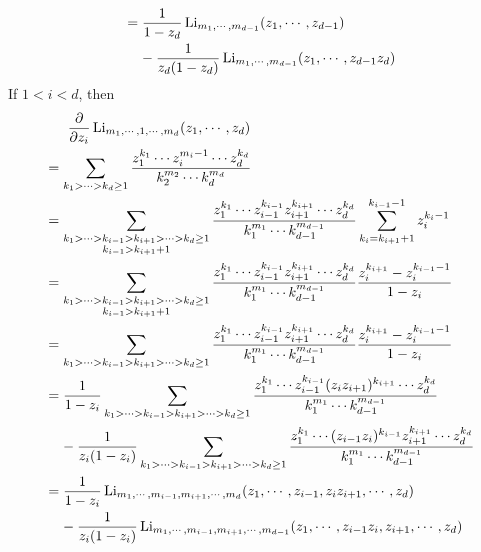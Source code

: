 \documentclass[main]{subfiles}
\begin{document}
\begin{exercise}
\begin{align*}
&=\frac{1}{1-z_d}\operatorname{Li}_{m_1,\cdots,m_{d-1}}(z_1,\cdots,z_{d-1}) \\
&\mkern20mu-\frac{1}{z_d(1-z_d)}\operatorname{Li}_{m_1,\cdots,m_{d-1}}(z_1,\cdots,z_{d-1}z_d)
\end{align*}
If $1<i<d$, then
\begin{align*}
&\mkern30mu\dfrac{\partial}{\partial z_i}\operatorname{Li}_{m_1,\cdots,1,\cdots,m_d}(z_1,\cdots,z_d) \\
&=\sum_{k_1>\cdots>k_d\geq1}\frac{z_1^{k_1}\cdots z_i^{m_i-1}\cdots z_d^{k_d}}{k_2^{m_2}\cdots k_d^{m_d}} \\
&=\sum_{\substack{k_1>\cdots>k_{i-1}>k_{i+1}>\cdots>k_d\geq1 \\ k_{i-1}>k_{i+1}+1}}\frac{z_1^{k_1}\cdots z_{i-1}^{k_{i-1}}z_{i+1}^{k_{i+1}}\cdots z_d^{k_d}}{k_1^{m_1}\cdots k_{d-1}^{m_{d-1}}}\sum_{k_i=k_{i+1}+1}^{k_{i-1}-1}z_i^{k_{i}-1} \\
&=\sum_{\substack{k_1>\cdots>k_{i-1}>k_{i+1}>\cdots>k_d\geq1 \\ k_{i-1}>k_{i+1}+1}}\frac{z_1^{k_1}\cdots z_{i-1}^{k_{i-1}}z_{i+1}^{k_{i+1}}\cdots z_d^{k_d}}{k_1^{m_1}\cdots k_{d-1}^{m_{d-1}}}\frac{z_i^{k_{i+1}}-z_i^{k_{i-1}-1}}{1-z_i} \\
&=\sum_{k_1>\cdots>k_{i-1}>k_{i+1}>\cdots>k_d\geq1}\frac{z_1^{k_1}\cdots z_{i-1}^{k_{i-1}}z_{i+1}^{k_{i+1}}\cdots z_d^{k_d}}{k_1^{m_1}\cdots k_{d-1}^{m_{d-1}}}\frac{z_i^{k_{i+1}}-z_i^{k_{i-1}-1}}{1-z_i} \\
&=\frac{1}{1-z_i}\sum_{k_1>\cdots>k_{i-1}>k_{i+1}>\cdots>k_d\geq1}\frac{z_1^{k_1}\cdots z_{i-1}^{k_{i-1}}(z_iz_{i+1})^{k_{i+1}}\cdots z_d^{k_d}}{k_1^{m_1}\cdots k_{d-1}^{m_{d-1}}} \\
&\mkern20mu-\frac{1}{z_i(1-z_i)}\sum_{k_1>\cdots>k_{i-1}>k_{i+1}>\cdots>k_d\geq1}\frac{z_1^{k_1}\cdots (z_{i-1}z_i)^{k_{i-1}}z_{i+1}^{k_{i+1}}\cdots z_d^{k_d}}{k_1^{m_1}\cdots k_{d-1}^{m_{d-1}}} \\
&=\frac{1}{1-z_i}\operatorname{Li}_{m_1,\cdots,m_{i-1},m_{i+1},\cdots,m_d}(z_1,\cdots,z_{i-1},z_iz_{i+1},\cdots,z_d) \\
&\mkern20mu-\frac{1}{z_i(1-z_i)}\operatorname{Li}_{m_1,\cdots,m_{i-1},m_{i+1},\cdots,m_{d-1}}(z_1,\cdots,z_{i-1}z_i,z_{i+1},\cdots,z_d)
\end{align*}
\end{exercise}
\end{document}

